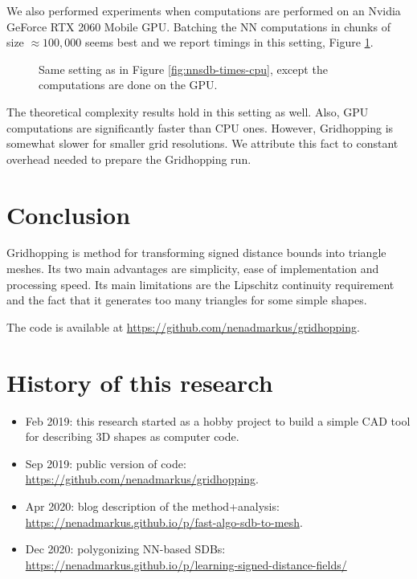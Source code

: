 \documentclass[11pt,twocolumn]{article}
\begin{document}
		We also performed experiments when computations are performed on an Nvidia GeForce RTX 2060 Mobile GPU.
		Batching the NN computations in chunks of size $\approx 100,000$ seems best and we report timings in this setting, Figure \ref{fig:nnsdb-times-gpu}.
		\begin{figure}
			\centering
			\resizebox{1.0\textwidth}{!}
			{
			
			}
			\resizebox{1.0\textwidth}{!}
			{
			
			}
			\caption
			{
				Same setting as in Figure \ref{fig:nnsdb-times-cpu}, except the computations are done on the GPU.
			}
			\label{fig:nnsdb-times-gpu}
		\end{figure}
		The theoretical complexity results hold in this setting as well.
		Also, GPU computations are significantly faster than CPU ones.
		However, Gridhopping is somewhat slower for smaller grid resolutions.
		We attribute this fact to constant overhead needed to prepare the Gridhopping run.

	\section{Conclusion}\label{sec:conclusion}
		Gridhopping is method for transforming signed distance bounds into triangle meshes.
		Its two main advantages are simplicity, ease of implementation and processing speed.
		Its main limitations are the Lipschitz continuity requirement and the fact that it generates too many triangles for some simple shapes.

		The code is available at \url{https://github.com/nenadmarkus/gridhopping}.

	\section{History of this research}
		\begin{itemize}
		\item
			Feb 2019: this research started as a hobby project to build a simple CAD tool for describing 3D shapes as computer code.
		\item
			Sep 2019: public version of code: \url{https://github.com/nenadmarkus/gridhopping}.
		\item
			Apr 2020: blog description of the method+analysis: \url{https://nenadmarkus.github.io/p/fast-algo-sdb-to-mesh}.
		\item
			Dec 2020: polygonizing NN-based SDBs: \url{https://nenadmarkus.github.io/p/learning-signed-distance-fields/}
		\end{itemize}

	
	
\end{document}
